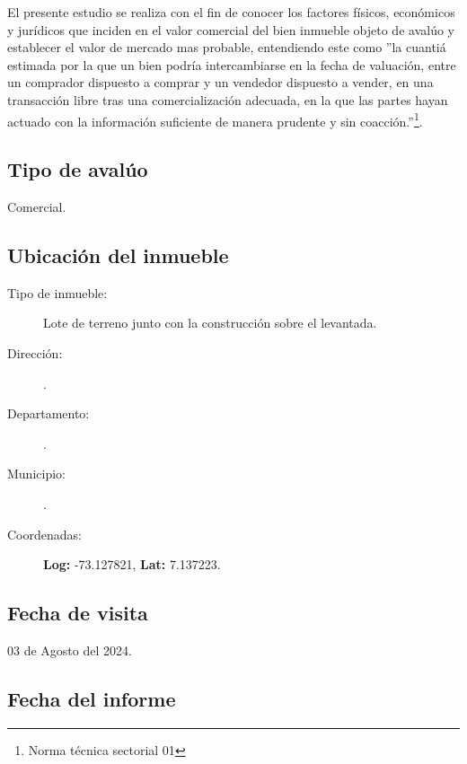 \documentclass[12pt,a4paper,twoside]{article}
\begin{document}
El presente estudio se realiza con el fin de conocer los factores físicos, económicos y jurídicos que inciden en el valor comercial del bien inmueble objeto de avalúo y establecer el valor de mercado mas probable, entendiendo este como ''la cuantiá estimada por la que un bien podría intercambiarse en la fecha de valuación, entre un comprador dispuesto a comprar y un vendedor dispuesto a vender, en una transacción libre tras una comercialización adecuada, en la que las partes hayan actuado con la información suficiente de manera prudente y sin coacción.''\footnote{Norma técnica sectorial 01}.

\subsection{Tipo de avalúo}

Comercial.

\subsection{Ubicación del inmueble}

\begin{description}
	
	\item[Tipo de inmueble: ] Lote de terreno junto con la construcción sobre el levantada.
	\item[Dirección: ] \Direccion.
	\item[Departamento: ] \Departamento.
	\item[Municipio: ] \Municipio.
	\item[Coordenadas: ] \textbf{Log:} 	
 -73.127821, \textbf{Lat:} 	
 7.137223. 
	
\end{description}
 
\subsection{Fecha de visita}
 
03 de Agosto del 2024.

\subsection{Fecha del informe}
\end{document}
